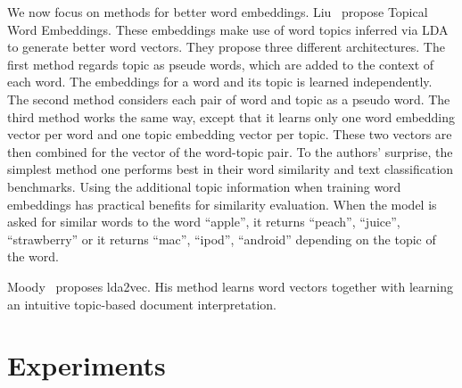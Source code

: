 \documentclass{sig-alternate-05-2015}
\begin{document}
We now focus on methods for better word embeddings.
Liu~\cite{Liu2015} propose Topical Word Embeddings.
These embeddings make use of word topics inferred via LDA to generate better word vectors.
They propose three different architectures.
The first method regards topic as pseude words, which are added to the context of each word.
The embeddings for a word and its topic is learned independently.
The second method considers each pair of word and topic as a pseudo word.
The third method works the same way, except that it learns only one word embedding vector per word and one topic embedding vector per topic.
These two vectors are then combined for the vector of the word-topic pair.
To the authors' surprise, the simplest method one performs best in their word similarity and text classification benchmarks.
Using the additional topic information when training word embeddings has practical benefits for similarity evaluation.
When the model is asked for similar words to the word ``apple'', it returns ``peach'', ``juice'', ``strawberry'' or it returns ``mac'', ``ipod'', ``android'' depending on the topic of the word.

Moody~\cite{Moody2016} proposes lda2vec.
His method learns word vectors together with learning an intuitive topic-based document interpretation.



\section{Experiments}
\label{sec:approach}
\end{document}
